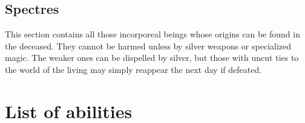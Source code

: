 \documentclass[parskip=full,11pt,%
footheight=38pt]{scrreport}
\begin{document}

\section{Spectres}\label{monster:spectre}
This section contains all those incorporeal beings whose origins can be found in the deceased. They cannot be
harmed unless by silver weapons or specialized magic. The weaker ones can be dispelled by silver, but those
with uncut ties to the world of the living may simply reappear the next day if defeated.


\chapter{List of abilities}

\abilitylist
\end{document}
